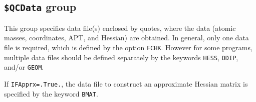 \documentclass[12pt,english]{extarticle}
\begin{document}
\subsection{\texttt{\$QCData} group} \label{sec:inp-qcdata}

This group specifies data file(s) enclosed by quotes, where the data (atomic
masses, coordinates, APT, and Hessian) are obtained. In general,
only one data file is required, which is defined by the option
\verb|FCHK|. However for some programs, multiple data files should be
defined separately by the keywords \verb|HESS|, \verb|DDIP|, and/or
\verb|GEOM|.

If \verb|IFApprx=.True.|, the data file to construct an approximate Hessian matrix is specified by the keyword \verb|BMAT|.

\end{document}
